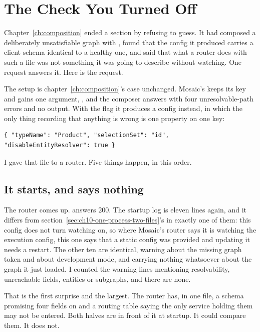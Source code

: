 \section{The Check You Turned Off}
\label{sec:ch10-the-check-you-turned-off}
%

Chapter~\ref{ch:composition} ended a section by refusing to guess. It had
composed a deliberately unsatisfiable graph with
, found that the config it produced
carries a client schema \code{===} identical to a healthy one, and said that
what a router does with such a file was not something it was going to describe
without watching. One request answers it. Here is the request.

The setup is chapter~\ref{ch:composition}'s  case
unchanged. Mosaic's  keeps its key and gains one argument,
, and the composer answers with four unresolvable-path
errors and no output. With the flag it produces a config instead, in which the
only thing recording that anything is wrong is one property on one key:

\begin{verbatim}
{ "typeName": "Product", "selectionSet": "id", "disableEntityResolver": true }
\end{verbatim}

I gave that file to a router. Five things happen, in this order.

\subsection*{It starts, and says nothing}

%
The router comes up.  answers 200. The startup log is eleven
lines again, and it differs from
section~\ref{sec:ch10-one-process-two-files}'s in exactly one of them: this
config does not turn watching on, so where Mosaic's router says it is watching
the execution config, this one says that a static config was provided and
updating it needs a restart. The other ten are identical, warning about the
missing graph token and about development mode, and carrying nothing whatsoever
about the graph it just loaded. I counted the warning lines mentioning
resolvability, unreachable fields, entities or subgraphs, and there are none.

That is the first surprise and the largest. The router has, in one file, a
schema promising four fields on  and a routing table saying the
only service holding them may not be entered. Both halves are in front of it at
startup. It could compare them. It does not.

